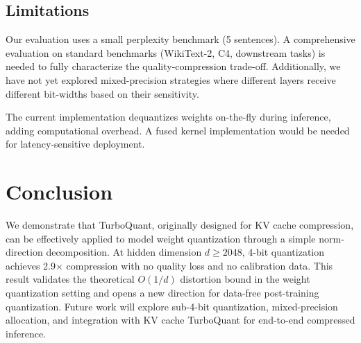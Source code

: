 \documentclass[11pt,twocolumn,letterpaper]{article}
\begin{document}
\subsection{Limitations}

Our evaluation uses a small perplexity benchmark (5 sentences). A comprehensive evaluation on standard benchmarks (WikiText-2, C4, downstream tasks) is needed to fully characterize the quality-compression trade-off. Additionally, we have not yet explored mixed-precision strategies where different layers receive different bit-widths based on their sensitivity.

The current implementation dequantizes weights on-the-fly during inference, adding computational overhead. A fused kernel implementation would be needed for latency-sensitive deployment.

\section{Conclusion}

We demonstrate that TurboQuant, originally designed for KV cache compression, can be effectively applied to model weight quantization through a simple norm-direction decomposition. At hidden dimension $d \geq 2048$, 4-bit quantization achieves 2.9$\times$ compression with no quality loss and no calibration data. This result validates the theoretical $O(1/d)$ distortion bound in the weight quantization setting and opens a new direction for data-free post-training quantization. Future work will explore sub-4-bit quantization, mixed-precision allocation, and integration with KV cache TurboQuant for end-to-end compressed inference.



\end{document}
